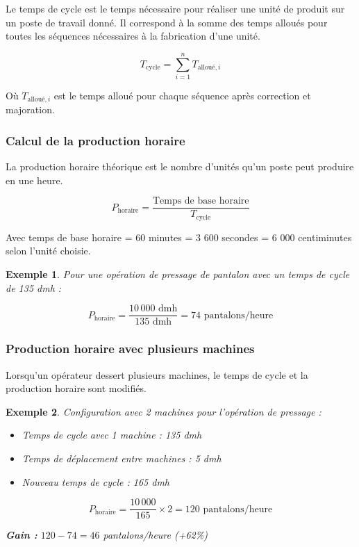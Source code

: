 \documentclass[a4paper,12pt]{article}
\newtheorem{exemple}{Exemple}[section]
\begin{document}
Le temps de cycle est le temps nécessaire pour réaliser une unité de produit sur un poste de travail donné. Il correspond à la somme des temps alloués pour toutes les séquences nécessaires à la fabrication d'une unité.

\[
T_{\text{cycle}} = \sum_{i=1}^{n} T_{\text{alloué},i}
\]

Où $T_{\text{alloué},i}$ est le temps alloué pour chaque séquence après correction et majoration.

\subsubsection{Calcul de la production horaire}

La production horaire théorique est le nombre d'unités qu'un poste peut produire en une heure.

\[
P_{\text{horaire}} = \frac{\text{Temps de base horaire}}{T_{\text{cycle}}}
\]

Avec temps de base horaire = 60 minutes = 3 600 secondes = 6 000 centiminutes selon l'unité choisie.

\begin{exemple}
Pour une opération de pressage de pantalon avec un temps de cycle de 135 dmh :

\[
P_{\text{horaire}} = \frac{10\,000 \text{ dmh}}{135 \text{ dmh}} = 74 \text{ pantalons/heure}
\]
\end{exemple}

\subsubsection{Production horaire avec plusieurs machines}

Lorsqu'un opérateur dessert plusieurs machines, le temps de cycle et la production horaire sont modifiés.

\begin{exemple}
Configuration avec 2 machines pour l'opération de pressage :

\begin{itemize}
    \item Temps de cycle avec 1 machine : 135 dmh
    \item Temps de déplacement entre machines : 5 dmh
    \item Nouveau temps de cycle : 165 dmh
\end{itemize}

\[
P_{\text{horaire}} = \frac{10\,000}{165} \times 2 = 120 \text{ pantalons/heure}
\]

\textbf{Gain :} $120 - 74 = 46$ pantalons/heure (+62\%)
\end{exemple}
\end{document}
